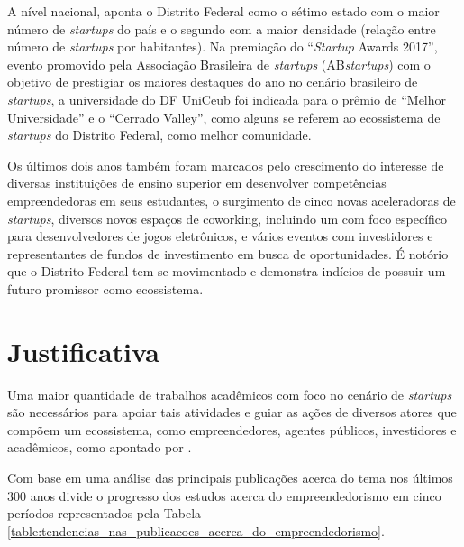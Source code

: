 A nível nacional,  aponta o Distrito Federal como o sétimo estado com o maior número de \textit{startups} do país e o segundo com a maior densidade (relação entre número de \textit{startups} por habitantes). Na premiação do ``\textit{Startup} Awards 2017'', evento promovido pela Associação Brasileira de \textit{startups} (AB\textit{startups}) com o objetivo de prestigiar os maiores destaques do ano no cenário brasileiro de \textit{startups}, a universidade do DF UniCeub foi indicada para o prêmio de ``Melhor Universidade'' e o ``Cerrado Valley'', como alguns se referem ao ecossistema de \textit{startups} do Distrito Federal, como melhor comunidade. 

Os últimos dois anos também foram marcados pelo crescimento do interesse de diversas instituições de ensino superior em desenvolver competências empreendedoras em seus estudantes, o surgimento de cinco novas aceleradoras de \textit{startups}, diversos novos espaços de coworking, incluindo um com foco específico para desenvolvedores de jogos eletrônicos, e vários eventos com investidores e representantes de fundos de investimento em busca de oportunidades. É notório que o Distrito Federal tem se movimentado e demonstra indícios de possuir um futuro promissor como ecossistema.

\section{Justificativa}
\label{section:justificativa}

Uma maior quantidade de trabalhos acadêmicos com foco no cenário de \textit{startups} são necessários para apoiar tais atividades e guiar as ações de diversos atores que compõem um ecossistema, como empreendedores, agentes públicos, investidores e acadêmicos, como apontado por .

Com base em uma análise das principais publicações acerca do tema nos últimos 300 anos  divide o progresso dos estudos acerca do empreendedorismo em cinco períodos representados pela Tabela \ref{table:tendencias_nas_publicacoes_acerca_do_empreendedorismo}.

